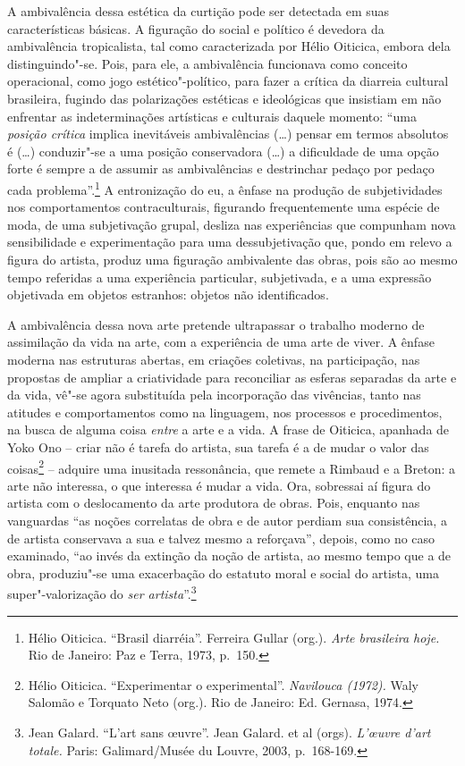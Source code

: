 A ambivalência dessa estética da curtição pode ser detectada em suas
características básicas. A figuração do social e político é devedora da
ambivalência tropicalista, tal como caracterizada por Hélio Oiticica,
embora dela distinguindo"-se. Pois, para ele, a ambivalência funcionava
como conceito operacional, como jogo estético"-político, para fazer a
crítica da diarreia cultural brasileira, fugindo das polarizações
estéticas e ideológicas que insistiam em não enfrentar as
indeterminações artísticas e culturais daquele momento: ``uma
\emph{posição crítica} implica inevitáveis ambivalências (\ldots{}) pensar em
termos absolutos é (\ldots{}) conduzir"-se a uma posição conservadora (\ldots{}) a
dificuldade de uma opção forte é sempre a de assumir as ambivalências e
destrinchar pedaço por pedaço cada problema''.\footnote{Hélio Oiticica.
  ``Brasil diarréia''. Ferreira Gullar (org.). \emph{Arte brasileira
  hoje.} Rio de Janeiro: Paz e Terra, 1973, p.~150.} A entronização do
eu, a ênfase na produção de subjetividades nos comportamentos
contraculturais, figurando frequentemente uma espécie de moda, de uma
subjetivação grupal, desliza nas experiências que compunham nova
sensibilidade e experimentação para uma dessubjetivação que, pondo em
relevo a figura do artista, produz uma figuração ambivalente das obras,
pois são ao mesmo tempo referidas a uma experiência particular,
subjetivada, e a uma expressão objetivada em objetos estranhos: objetos
não identificados.

A ambivalência dessa nova arte pretende ultrapassar o trabalho moderno
de assimilação da vida na arte, com a experiência de uma arte de viver.
A ênfase moderna nas estruturas abertas, em criações coletivas, na
participação, nas propostas de ampliar a criatividade para reconciliar
as esferas separadas da arte e da vida, vê"-se agora substituída pela
incorporação das vivências, tanto nas atitudes e comportamentos como na
linguagem, nos processos e procedimentos, na busca de alguma coisa
\emph{entre} a arte e a vida. A frase de Oiticica, apanhada de Yoko Ono
-- criar não é tarefa do artista, sua tarefa é a de mudar o valor das
coisas\footnote{Hélio Oiticica. ``Experimentar o experimental''.
  \emph{Navilouca (1972).} Waly Salomão e Torquato Neto (org.). Rio de
  Janeiro: Ed. Gernasa, 1974.} -- adquire uma inusitada ressonância, que
remete a Rimbaud e a Breton: a arte não interessa, o que interessa é
mudar a vida. Ora, sobressai aí figura do artista com o deslocamento da
arte produtora de obras. Pois, enquanto nas vanguardas ``as noções
correlatas de obra e de autor perdiam sua consistência, a de artista
conservava a sua e talvez mesmo a reforçava'', depois, como no caso
examinado, ``ao invés da extinção da noção de artista, ao mesmo tempo
que a de obra, produziu"-se uma exacerbação do estatuto moral e social do
artista, uma super"-valorização do \emph{ser artista}''.\footnote{Jean
  Galard. ``L'art sans \oe uvre''. Jean Galard. et al (orgs).
  \emph{L'\oe uvre d'art totale.} Paris: Galimard/Musée du Louvre, 2003,
  p.~168-169.}

